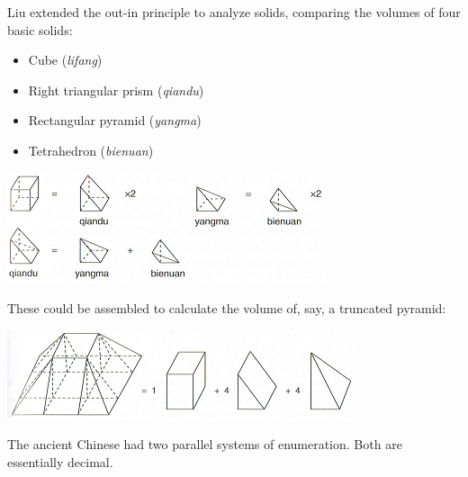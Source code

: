 Liu extended the out-in principle to analyze solids, comparing the volumes of four basic solids:\par
\begin{minipage}[t]{0.4\linewidth}\vspace{0pt}
	\begin{itemize}
	  \item Cube (\emph{lifang})
	  \item Right triangular prism (\emph{qiandu})
	  \item Rectangular pyramid (\emph{yangma})
	  \item Tetrahedron (\emph{bienuan})
	\end{itemize}
\end{minipage}
\hfill
\begin{minipage}[t]{0.59\linewidth}\vspace{0pt}
	\flushright\includegraphics[scale=1]{fund-pieces-small}
\end{minipage}\medbreak
These could be assembled to calculate the volume of, say, a truncated pyramid:
\begin{center}
	\includegraphics[scale=1]{pyramid-small}
\end{center}
\goodbreak





The ancient Chinese had two parallel systems of enumeration. Both are essentially decimal.

  
